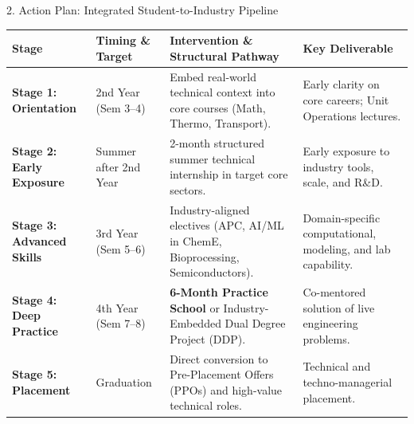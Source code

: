 \documentclass[aspectratio=169, 10pt]{beamer}
\begin{document}
\begin{frame}{2. Action Plan: Integrated Student-to-Industry Pipeline}
  \scriptsize
  \renewcommand{\arraystretch}{1.25}
  \centering
  \begin{tabular}{L{2.0cm} L{2.5cm} L{5.5cm} L{3.8cm}}
    \toprule
    \textbf{Stage} & \textbf{Timing \& Target} & \textbf{Intervention \& Structural Pathway} & \textbf{Key Deliverable} \\
    \midrule
    \textbf{Stage 1: Orientation} & 2nd Year (Sem 3--4) & Embed real-world technical context into core courses (Math, Thermo, Transport). & Early clarity on core careers; Unit Operations lectures. \\
    \addlinespace[2pt]
    \textbf{Stage 2: Early Exposure} & Summer after 2nd Year & 2-month structured summer technical internship in target core sectors. & Early exposure to industry tools, scale, and R\&D. \\
    \addlinespace[2pt]
    \textbf{Stage 3: Advanced Skills} & 3rd Year (Sem 5--6) & Industry-aligned electives (APC, AI/ML in ChemE, Bioprocessing, Semiconductors). & Domain-specific computational, modeling, and lab capability. \\
    \addlinespace[2pt]
    \textbf{Stage 4: Deep Practice} & 4th Year (Sem 7--8) & \textbf{6-Month Practice School} or Industry-Embedded Dual Degree Project (DDP). & Co-mentored solution of live engineering problems. \\
    \addlinespace[2pt]
    \textbf{Stage 5: Placement} & Graduation & Direct conversion to Pre-Placement Offers (PPOs) and high-value technical roles. & Technical and techno-managerial placement. \\
    \bottomrule
  \end{tabular}
\end{frame}
\end{document}
